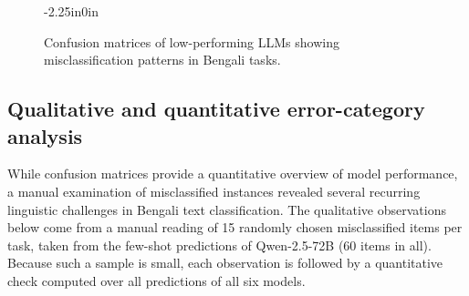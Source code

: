 \documentclass[10pt,letterpaper]{article}
\begin{document}
\begin{figure}[!t]
\begin{adjustwidth}{-2.25in}{0in}
\centering

\hfill
{}
\hfill
{}

\vspace{0.3cm}

\hfill
{}
\hfill
{}

\vspace{0.3cm}


\caption{Confusion matrices of low-performing LLMs showing misclassification patterns in Bengali tasks.}
\label{fig:confusion_matrices_worst}
\end{adjustwidth}
\end{figure}


\subsection*{Qualitative and quantitative error-category analysis}

While confusion matrices provide a quantitative overview of model performance, a manual examination of misclassified instances revealed several recurring linguistic challenges in Bengali text classification. The qualitative observations below come from a manual reading of 15 randomly chosen misclassified items per task, taken from the few-shot predictions of Qwen-2.5-72B (60 items in all). Because such a sample is small, each observation is followed by a quantitative check computed over all predictions of all six models.
\end{document}
